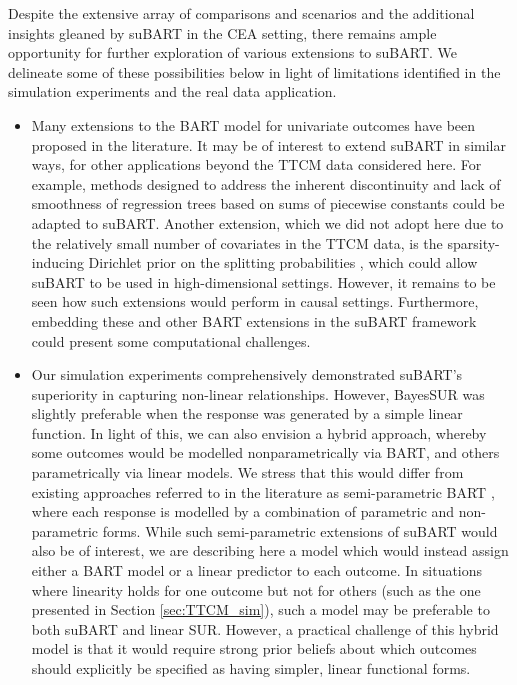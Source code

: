 \documentclass[aoas,preprint]{imsart}
\theoremstyle{plain}
\theoremstyle{definition}
\theoremstyle{remark}
\begin{document}
Despite the extensive array of comparisons and scenarios and the additional insights gleaned by suBART in the CEA setting, there remains ample opportunity for further exploration of various extensions to suBART. We delineate some of these possibilities below in light of limitations identified in the simulation experiments and the real data application.
\begin{itemize}[wide]
    \item Many extensions to the BART model for univariate outcomes have been proposed in the literature. It may be of interest to extend suBART in similar ways, for other applications beyond the TTCM data considered here. For example, methods designed to address the inherent discontinuity and lack of smoothness of regression trees based on sums of piecewise constants \citep[e.g.][]{linero2018bayesian, prado2021bayesian, maia2024gp} could be adapted to suBART. Another extension, which we did not adopt here due to the relatively small number of covariates in the TTCM data, is the sparsity-inducing Dirichlet prior on the splitting probabilities \citep{linero2018highdim}, which could allow suBART to be used in high-dimensional settings. However, it remains to be seen how such extensions would perform in causal settings. Furthermore, embedding these and other BART extensions in the suBART framework could present some computational challenges.
    \item Our simulation experiments comprehensively demonstrated suBART's superiority in capturing non-linear relationships. However, BayesSUR was slightly preferable when the response was generated by a simple linear function. In light of this, we can also envision a hybrid approach, whereby some outcomes would be modelled nonparametrically via BART, and others parametrically via linear models. We stress that this would differ from existing approaches referred to in the literature as semi-parametric BART \citep[e.g.][]{zeldow2019semiparametric,deshpande2020,prado2025accounting}, where each response is modelled by a combination of parametric and non-parametric forms. While such semi-parametric extensions of suBART would also be of interest, we are describing here a model which would instead assign either a BART model or a linear predictor to each outcome. In situations where linearity holds for one outcome but not for others (such as the one presented in Section \ref{sec:TTCM_sim}), such a model may be preferable to both suBART and linear SUR. 
    However, a practical challenge of this hybrid model is that it would require strong prior beliefs about which outcomes should explicitly be specified as having simpler, linear functional forms. 

\end{itemize}
\end{document}
